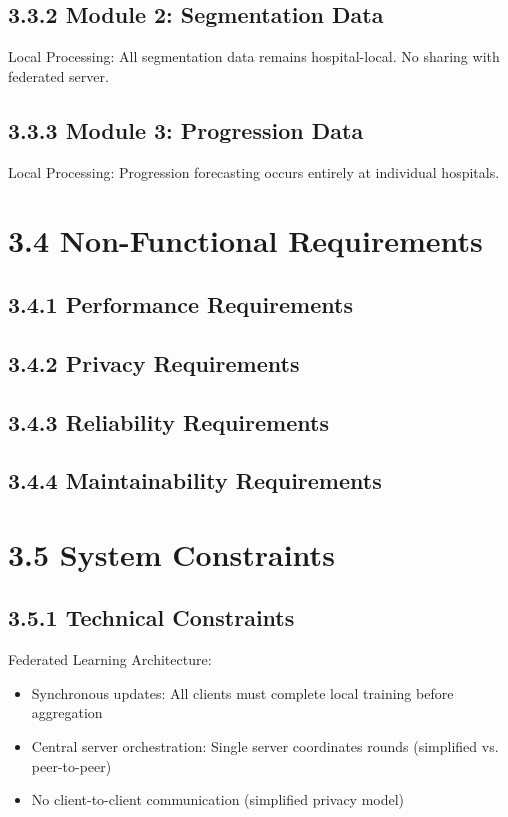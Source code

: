 \subsection{3.3.2 Module 2: Segmentation Data}
Local Processing: All segmentation data remains hospital-local. No sharing with federated server.


\subsection{3.3.3 Module 3: Progression Data}
Local Processing: Progression forecasting occurs entirely at individual hospitals.


\section{3.4 Non-Functional Requirements}

\subsection{3.4.1 Performance Requirements}

\subsection{3.4.2 Privacy Requirements}

\subsection{3.4.3 Reliability Requirements}

\subsection{3.4.4 Maintainability Requirements}

\section{3.5 System Constraints}

\subsection{3.5.1 Technical Constraints}
Federated Learning Architecture:

\begin{itemize}
  \item Synchronous updates: All clients must complete local training before aggregation
  \item Central server orchestration: Single server coordinates rounds (simplified vs. peer-to-peer)
  \item No client-to-client communication (simplified privacy model)
\end{itemize}

